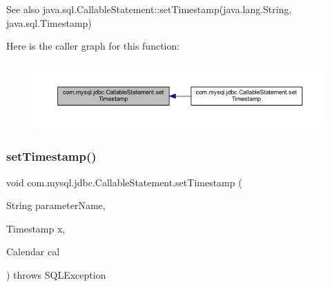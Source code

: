 \begin{DoxySeeAlso}{See also}
java.\+sql.\+Callable\+Statement\+::set\+Timestamp(java.\+lang.\+String, java.\+sql.\+Timestamp) 
\end{DoxySeeAlso}
Here is the caller graph for this function\+:\nopagebreak
\begin{figure}[H]
\begin{center}
\leavevmode
\includegraphics[width=350pt]{classcom_1_1mysql_1_1jdbc_1_1_callable_statement_a09f76d55b898a951fb5a754781c859ee_icgraph}
\end{center}
\end{figure}
\mbox{\label{classcom_1_1mysql_1_1jdbc_1_1_callable_statement_a42215831c39b5cfa589e7e2906f1de17}} 
\subsubsection{\texorpdfstring{set\+Timestamp()}{setTimestamp()}\hspace{0.1cm}{\footnotesize\ttfamily [2/2]}}
{\footnotesize\ttfamily void com.\+mysql.\+jdbc.\+Callable\+Statement.\+set\+Timestamp (\begin{DoxyParamCaption}\item[{String}]{parameter\+Name,  }\item[{Timestamp}]{x,  }\item[{Calendar}]{cal }\end{DoxyParamCaption}) throws S\+Q\+L\+Exception}

